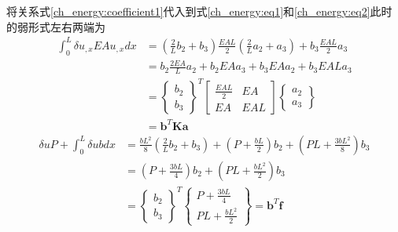 将关系式\eqref{ch_energy:coefficient1}代入到式\eqref{ch_energy:eq1}和\eqref{ch_energy:eq2}此时的弱形式左右两端为
\begin{equation}
\begin{split}
    \int_0^L \delta u_{,x}EA u_{,x} dx &= (\frac{2}{L}b_2+b_3) \frac{EAL}{2} (\frac{2}{L}a_2+a_3) + b_3 \frac{EAL}{2} a_3 \\
                                       &= b_2 \frac{2EA}{L} a_2 + b_2 EA a_3 + b_3 EA a_2 + b_3 EAL a_3 \\
                                       &= \begin{Bmatrix}
                                       b_2 \\ b_3 
                                       \end{Bmatrix}^T
                                       \begin{bmatrix}
                                       \frac{EAL}{2} & EA \\
                                       EA & EAL
                                       \end{bmatrix}
                                       \begin{Bmatrix}
                                       a_2 \\ a_3 
                                       \end{Bmatrix} \\
                                       &= \boldsymbol b^T \boldsymbol K \boldsymbol a
\end{split}
\end{equation}
\begin{equation}
\begin{split}
    \delta u P + \int_0^L \delta u b dx &= \frac{bL^2}{8}(\frac{2}{L}b_2 + b_3) + (P+\frac{bL}{2})b_2 + (PL + \frac{3bL^2}{8})b_3 \\
                                        &= (P+\frac{3bL}{4})b_2 + (PL + \frac{bL^2}{2})b_3 \\
                                        &= \begin{Bmatrix}
                                        b_2 \\ b_3 
                                        \end{Bmatrix}^T
                                        \begin{Bmatrix}
                                        P+\frac{3bL}{4} \\ PL + \frac{bL^2}{2}
                                        \end{Bmatrix} = \boldsymbol b^T \boldsymbol f
\end{split}
\end{equation}
